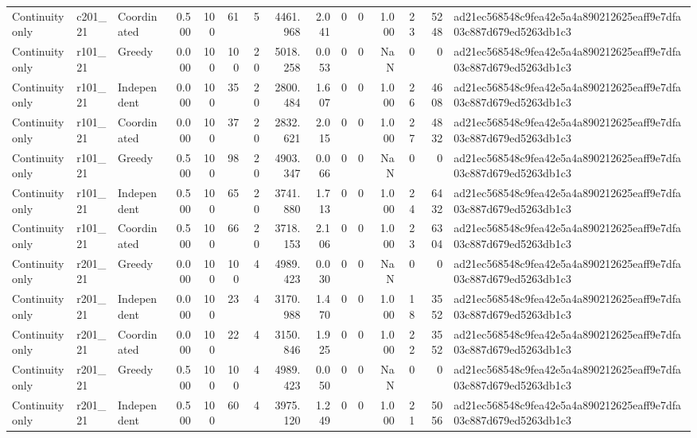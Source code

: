 \begin{tabular}{lllrrrrrrrrrrrl}
Continuity only & c201\_21 & Coordinated & 0.500 & 100 & 61 & 5 & 4461.968 & 2.041 & 0 & 0 & 1.000 & 23 & 5248 & ad21ec568548c9fea42e5a4a890212625eaff9e7dfa03c887d679ed5263db1c3 \\
Continuity only & r101\_21 & Greedy & 0.000 & 100 & 100 & 20 & 5018.258 & 0.053 & 0 & 0 & NaN & 0 & 0 & ad21ec568548c9fea42e5a4a890212625eaff9e7dfa03c887d679ed5263db1c3 \\
Continuity only & r101\_21 & Independent & 0.000 & 100 & 35 & 20 & 2800.484 & 1.607 & 0 & 0 & 1.000 & 26 & 4608 & ad21ec568548c9fea42e5a4a890212625eaff9e7dfa03c887d679ed5263db1c3 \\
Continuity only & r101\_21 & Coordinated & 0.000 & 100 & 37 & 20 & 2832.621 & 2.015 & 0 & 0 & 1.000 & 27 & 4832 & ad21ec568548c9fea42e5a4a890212625eaff9e7dfa03c887d679ed5263db1c3 \\
Continuity only & r101\_21 & Greedy & 0.500 & 100 & 98 & 20 & 4903.347 & 0.066 & 0 & 0 & NaN & 0 & 0 & ad21ec568548c9fea42e5a4a890212625eaff9e7dfa03c887d679ed5263db1c3 \\
Continuity only & r101\_21 & Independent & 0.500 & 100 & 65 & 20 & 3741.880 & 1.713 & 0 & 0 & 1.000 & 24 & 6432 & ad21ec568548c9fea42e5a4a890212625eaff9e7dfa03c887d679ed5263db1c3 \\
Continuity only & r101\_21 & Coordinated & 0.500 & 100 & 66 & 20 & 3718.153 & 2.106 & 0 & 0 & 1.000 & 23 & 6304 & ad21ec568548c9fea42e5a4a890212625eaff9e7dfa03c887d679ed5263db1c3 \\
Continuity only & r201\_21 & Greedy & 0.000 & 100 & 100 & 4 & 4989.423 & 0.030 & 0 & 0 & NaN & 0 & 0 & ad21ec568548c9fea42e5a4a890212625eaff9e7dfa03c887d679ed5263db1c3 \\
Continuity only & r201\_21 & Independent & 0.000 & 100 & 23 & 4 & 3170.988 & 1.470 & 0 & 0 & 1.000 & 18 & 3552 & ad21ec568548c9fea42e5a4a890212625eaff9e7dfa03c887d679ed5263db1c3 \\
Continuity only & r201\_21 & Coordinated & 0.000 & 100 & 22 & 4 & 3150.846 & 1.925 & 0 & 0 & 1.000 & 22 & 3552 & ad21ec568548c9fea42e5a4a890212625eaff9e7dfa03c887d679ed5263db1c3 \\
Continuity only & r201\_21 & Greedy & 0.500 & 100 & 100 & 4 & 4989.423 & 0.050 & 0 & 0 & NaN & 0 & 0 & ad21ec568548c9fea42e5a4a890212625eaff9e7dfa03c887d679ed5263db1c3 \\
Continuity only & r201\_21 & Independent & 0.500 & 100 & 60 & 4 & 3975.120 & 1.249 & 0 & 0 & 1.000 & 21 & 5056 & ad21ec568548c9fea42e5a4a890212625eaff9e7dfa03c887d679ed5263db1c3 \\

\end{tabular}
